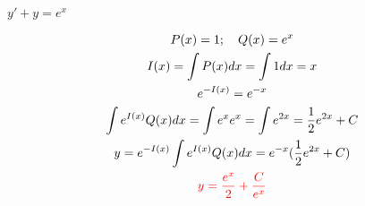 \item [1.] $y'+y=e^x$

\textcolor{blue}{
    \begin{gather*}
        P(x)=1; \quad Q(x)=e^x\\
        I(x)=\int P(x)dx = \int 1dx=x\\
        e^{-I(x)}=e^{-x}\\
        \int e^{I(x)}Q(x)dx=\int e^xe^x=\int e^{2x}=\frac{1}{2}e^{2x}+C\\
        y=e^{-I(x)}\int e^{I(x)}Q(x)dx=e^{-x}(\frac{1}{2}e^{2x}+C)\\
        \textcolor{red}{
        y=\frac{e^x}{2}+\frac{C}{e^x}   
        }
    \end{gather*}
}